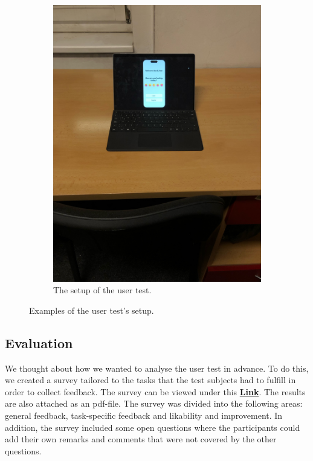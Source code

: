 \documentclass[11pt]{article}
\begin{document}
\begin{figure}[h!]
\begin{subfigure}[b]{0.53\textwidth}
         \includegraphics[width=\textwidth, angle=-90]{figures/Test Setup front.jpeg}
         \caption{The setup of the user test.}
         \label{fig:setup}
     \end{subfigure}
        \caption{Examples of the user test's setup.}
\end{figure}
\clearpage

\subsection{Evaluation}
We thought about how we wanted to analyse the user test in advance. To do this, we created a survey tailored to the tasks that the test subjects had to fulfill in order to collect feedback. The survey can be viewed under this \href{https://docs.google.com/forms/d/1U5oVMFaqayj4dQOzH1bHhzPKYYohCEgottdfab2rS8Q/edit#responses}{\textbf{Link}}. The results are also attached as an pdf-file. The survey was divided into the following areas: general feedback, task-specific feedback and likability and improvement. In addition, the survey included some open questions where the participants could add their own remarks and comments that were not covered by the other questions.
\end{document}
